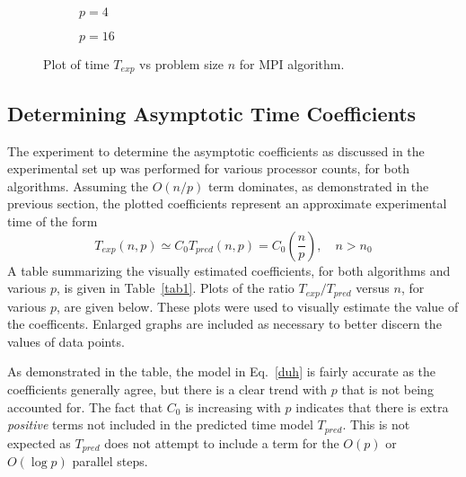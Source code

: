 \documentclass[12pt]{article}
\begin{document}
{{{{     \begin{figure}[htbp!]
         \begin{subfigure}{0.5\textwidth}
         \centering
           \caption{$p=4$ \label{mpin4}}
     \end{subfigure}
     \begin{subfigure}{0.5\textwidth}
           \centering
           \caption{$p=16$ \label{mpin16}}
       \end{subfigure}
        \caption{Plot of time $T_{exp}$ vs problem size $n$ for MPI
           algorithm.\label{mpin}}
     \end{figure}


\clearpage
\subsection{Determining Asymptotic Time Coefficients}

The experiment to determine the asymptotic coefficients as discussed in the
experimental set up was performed for various processor counts, for both algorithms.
Assuming the $O(n/p)$ term dominates, as demonstrated in the previous section, the plotted coefficients represent an
approximate experimental time of the form
\begin{equation}
    T_{exp}(n,p) \simeq C_{0}T_{pred}(n,p) = C_{0}\left(\frac{n}{p}\right), \quad n>n_0
    \label{duh}
\end{equation}
A table summarizing the visually estimated coefficients, for both algorithms and various $p$,  is
given in Table~\ref{tab1}. Plots of the ratio $T_{exp}/T_{pred}$ versus $n$, for
various $p$, are given below.  These plots were used to visually estimate the value
of the coefficents.  Enlarged graphs are included as necessary to 
better discern the values of data points.

As demonstrated in the table, the model in
Eq.~\eqref{duh} is fairly accurate as the coefficients generally agree, but there is
a clear trend with $p$ that is not being accounted for.  The fact that $C_0$ is increasing
with $p$ indicates that there is extra \emph{positive} terms not included in the
predicted time model $T_{pred}$.  This is not expected as $T_{pred}$ does not attempt
to include a term for the $O(p)$ or $O(\log p)$ parallel steps.   

}}}}
\end{document}
